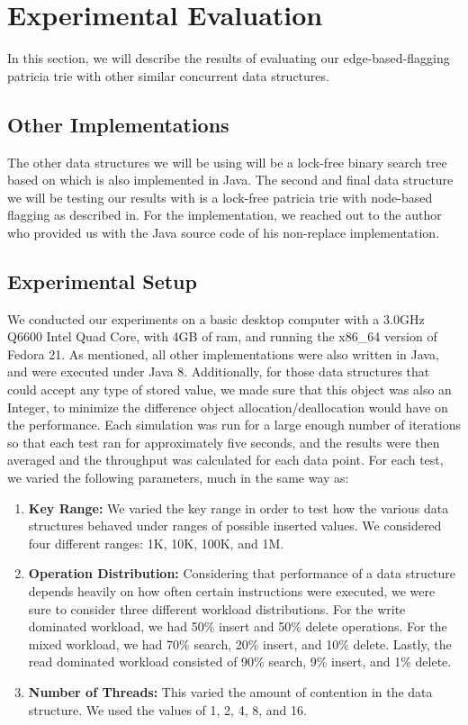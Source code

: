 \documentclass[conference]{IEEEtran}
\begin{document}
\section{Experimental Evaluation}
In this section, we will describe the results of evaluating our edge-based-flagging patricia trie with other similar concurrent data structures.

\subsection{Other Implementations}
The other data structures we will be using will be a lock-free binary search tree based on\cite{Natarajan2014} which is also implemented in Java\cite{LFBST}. The second and final data structure we will be testing our results with is a lock-free patricia trie with node-based flagging as described in\cite{Shafiei2013}. For the implementation, we reached out to the author who provided us with the Java source code of his non-replace implementation.

\subsection{Experimental Setup}
We conducted our experiments on a basic desktop computer with a 3.0GHz Q6600 Intel Quad Core, with 4GB of ram, and running the x86\_64 version of Fedora 21. As mentioned, all other implementations were also written in Java, and were executed under Java 8. Additionally, for those data structures that could accept any type of stored value, we made sure that this object was also an Integer, to minimize the difference object allocation/deallocation would have on the performance. Each simulation was run for a large enough number of iterations so that each test ran for approximately five seconds, and the results were then averaged and the throughput was calculated for each data point. For each test, we varied the following parameters, much in the same way as\cite{Natarajan2014}:

\begin{enumerate}
  \item \textbf{Key Range:} We varied the key range in order to test how the various data structures behaved under ranges of possible inserted values. We considered four different ranges: 1K, 10K, 100K, and 1M.
  \item \textbf{Operation Distribution:} Considering that performance of a data structure depends heavily on how often certain instructions were executed, we were sure to consider three different workload distributions. For the write dominated workload, we had 50\% insert and 50\% delete operations. For the mixed workload, we had 70\% search, 20\% insert, and 10\% delete. Lastly, the read dominated workload consisted of 90\% search, 9\% insert, and 1\% delete.
  \item \textbf{Number of Threads:} This varied the amount of contention in the data structure. We used the values of 1, 2, 4, 8, and 16.
\end{enumerate}
\end{document}
